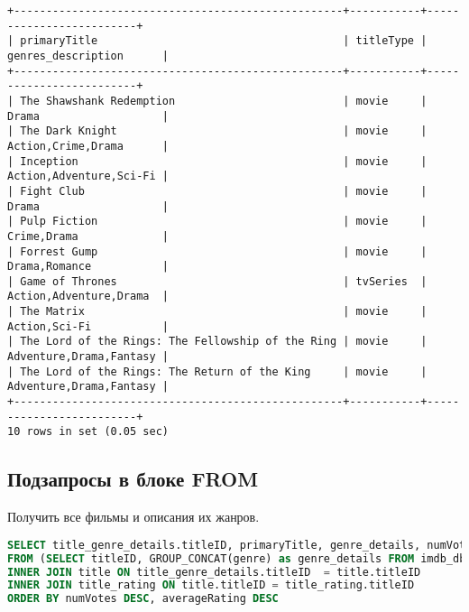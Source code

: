 \documentclass[12pt,a4paper]{article}
\begin{document}
\begin{lstlisting}[basicstyle = \tiny\ttfamily, columns = fixed]
+---------------------------------------------------+-----------+-------------------------+
| primaryTitle                                      | titleType | genres_description      |
+---------------------------------------------------+-----------+-------------------------+
| The Shawshank Redemption                          | movie     | Drama                   |
| The Dark Knight                                   | movie     | Action,Crime,Drama      |
| Inception                                         | movie     | Action,Adventure,Sci-Fi |
| Fight Club                                        | movie     | Drama                   |
| Pulp Fiction                                      | movie     | Crime,Drama             |
| Forrest Gump                                      | movie     | Drama,Romance           |
| Game of Thrones                                   | tvSeries  | Action,Adventure,Drama  |
| The Matrix                                        | movie     | Action,Sci-Fi           |
| The Lord of the Rings: The Fellowship of the Ring | movie     | Adventure,Drama,Fantasy |
| The Lord of the Rings: The Return of the King     | movie     | Adventure,Drama,Fantasy |
+---------------------------------------------------+-----------+-------------------------+
10 rows in set (0.05 sec)
\end{lstlisting}

\subsection{Подзапросы в блоке FROM}

Получить все фильмы и описания их жанров.

\begin{lstlisting}[language=SQL]
SELECT title_genre_details.titleID, primaryTitle, genre_details, numVotes, averageRating
FROM (SELECT titleID, GROUP_CONCAT(genre) as genre_details FROM imdb_db_part.title_genre GROUP BY titleID) title_genre_details
INNER JOIN title ON title_genre_details.titleID  = title.titleID
INNER JOIN title_rating ON title.titleID = title_rating.titleID
ORDER BY numVotes DESC, averageRating DESC
\end{lstlisting}
\end{document}
